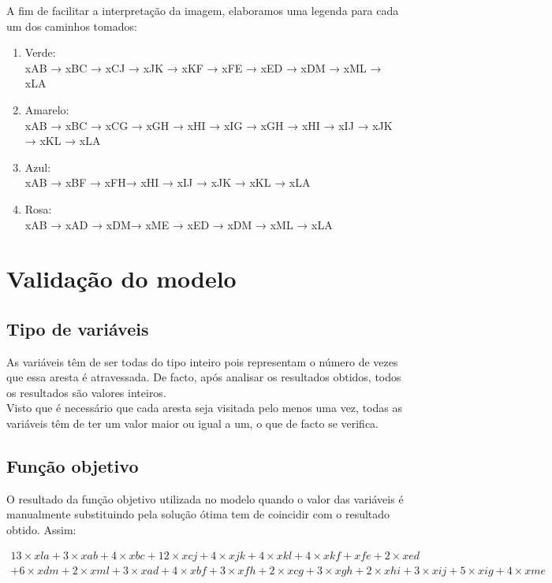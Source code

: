 \documentclass[a4paper]{report}
\begin{document}
A fim de facilitar a interpretação da imagem, elaboramos uma legenda para cada
um dos caminhos tomados:

\begin{enumerate}
    \item Verde: \\
    xAB → xBC → xCJ → xJK → xKF → xFE → xED → xDM → xML → xLA
    \item Amarelo: \\
    xAB → xBC → xCG → xGH → xHI  → xIG → xGH → xHI → xIJ → xJK  → xKL  → xLA
    \item Azul: \\
    xAB → xBF → xFH→ xHI  → xIJ → xJK  → xKL  → xLA
    \item Rosa: \\
    xAB → xAD → xDM→ xME → xED  → xDM → xML → xLA
\end{enumerate}

\chapter{Validação do modelo}
\section{Tipo de variáveis}
As variáveis têm de ser todas do tipo inteiro pois representam o número
de vezes que essa aresta é atravessada.
De facto, após analisar os resultados obtidos, todos os resultados são
valores inteiros.\\
Visto que é necessário que cada aresta seja visitada pelo menos uma
vez, todas as variáveis têm de ter um valor maior ou igual a um, o
que de facto se verifica.

\section{Função objetivo}
O resultado da função objetivo utilizada no modelo quando o valor
das variáveis é manualmente substituindo pela solução ótima tem de 
coincidir com o resultado obtido.
Assim:

\begin{multline}
13\times xla + 3\times xab + 4\times xbc + 12\times xcj + 4\times
xjk + 4\times xkl + 4\times xkf + xfe + 2\times xed \\ + 6\times xdm +
2\times xml + 3\times xad + 4\times xbf + 3\times xfh + 2\times xcg +
3\times xgh + 2\times xhi + 3\times xij + 5\times xig + 4\times xme
\end{multline}
\end{document}
